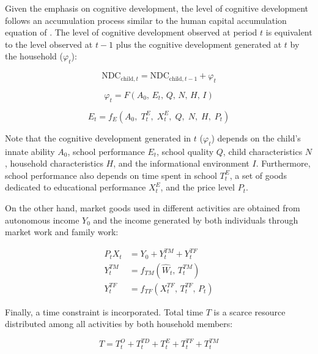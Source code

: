 \documentclass[12pt]{article}
\newcommand{\NDC}{\mathrm{NDC}}
\newcommand{\child}{\text{child}}
\begin{document}
Given the emphasis on cognitive development, the level of cognitive development
follows an accumulation process similar to the human capital accumulation
equation of \citet{benporath1967}. The level of cognitive development observed
at period $t$ is equivalent to the level observed at $t-1$ plus the cognitive
development generated at $t$ by the household ($\varphi_t$):

\begin{equation}
  \NDC_{\child,t} = \NDC_{\child,t-1} + \varphi_t
  \tag{A.7}
  \label{appeq:ndc}
\end{equation}

\begin{equation}
  \varphi_t = F(A_0,\, E_t,\, Q,\, N,\, H,\, I)
  \tag{A.8}
  \label{appeq:phi}
\end{equation}

\begin{equation}
  E_t = f_E\!\left(A_0,\; T_t^{E},\; X_t^{E},\; Q,\; N,\; H,\; P_t\right)
  \tag{A.9}
  \label{appeq:education}
\end{equation}

Note that the cognitive development generated in $t$ ($\varphi_t$) depends on
the child's innate ability $A_0$, school performance $E_t$, school quality $Q$,
child characteristics $N$, household characteristics $H$, and the
informational environment $I$. Furthermore, school performance also depends on
time spent in school $T_t^{E}$, a set of goods dedicated to educational
performance $X_t^{E}$, and the price level $P_t$.

On the other hand, market goods used in different activities are obtained from
autonomous income $Y_0$ and the income generated by both individuals through
market work and family work:

\begin{align}
  P_t X_t &= Y_0 + Y_t^{TM} + Y_t^{TF}
  \tag{A.10}
  \label{appeq:budget} \\
  Y_t^{TM} &= f_{TM}\!\left(\hat{W}_t,\, T_t^{TM}\right)
  \tag{A.11}
  \label{appeq:income_tm} \\
  Y_t^{TF} &= f_{TF}\!\left(X_t^{TF},\, T_t^{TF},\, P_t\right)
  \tag{A.12}
  \label{appeq:income_tf}
\end{align}

Finally, a time constraint is incorporated. Total time $T$ is a scarce
resource distributed among all activities by both household members:

\begin{equation}
  T = T_t^{O} + T_t^{TD} + T_t^{E} + T_t^{TF} + T_t^{TM}
  \tag{A.13}
  \label{appeq:time}
\end{equation}
\end{document}
